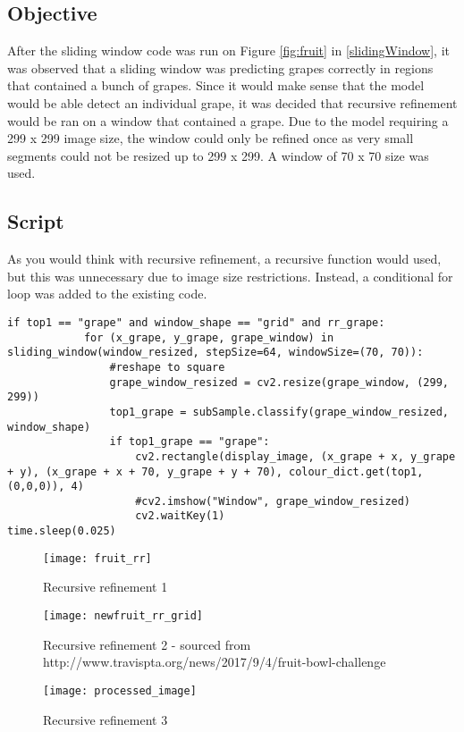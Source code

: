 \subsection*{Objective}
After the sliding window code was run on Figure \ref{fig:fruit} in \ref{slidingWindow},
it was observed that a sliding window was predicting grapes correctly in
regions that contained a bunch of grapes. Since it would make sense that the
model would be able detect an individual grape, it was decided that
recursive refinement would be ran on a window that contained a grape. Due to the model
requiring a 299 x 299 image size, the window could only be refined once as
very small segments could not be resized up to 299 x 299. A window of 70 x 70 size was used.

\subsection*{Script}
As you would think with recursive refinement, a recursive function would used,
but this was unnecessary due to image size restrictions. Instead, a
conditional for loop was added to the existing code.
\begin{lstlisting}[style=Python]
if top1 == "grape" and window_shape == "grid" and rr_grape:
			for (x_grape, y_grape, grape_window) in sliding_window(window_resized, stepSize=64, windowSize=(70, 70)):
				#reshape to square
				grape_window_resized = cv2.resize(grape_window, (299, 299))
				top1_grape = subSample.classify(grape_window_resized, window_shape)
				if top1_grape == "grape":
					cv2.rectangle(display_image, (x_grape + x, y_grape + y), (x_grape + x + 70, y_grape + y + 70), colour_dict.get(top1, (0,0,0)), 4)
					#cv2.imshow("Window", grape_window_resized)
					cv2.waitKey(1)
time.sleep(0.025)
\end{lstlisting}

\begin{figure}
    \texttt{[image: fruit\_rr]}
      \caption{Recursive refinement 1}
      \label{fig:rr1}
\end{figure}

\begin{figure}
    \texttt{[image: newfruit\_rr\_grid]}
      \caption{Recursive refinement 2 - sourced from http://www.travispta.org/news/2017/9/4/fruit-bowl-challenge}
      \label{fig:rr2}
\end{figure}

\begin{figure}
    \texttt{[image: processed\_image]}
      \caption{Recursive refinement 3}
      \label{fig:rr3}
\end{figure}


